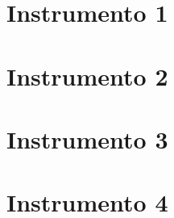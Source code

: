 \begin{apendicesenv}
\section{Instrumento 1}
    \begin{figure}
        \centering
         
    \end{figure}
\newpage
\section{Instrumento 2}
    \begin{figure}
        \centering
         
    \end{figure}
\newpage
\section{Instrumento 3}
    \begin{figure}
        \centering
         
    \end{figure}
\newpage
\section{Instrumento 4}
    \begin{figure}
        \centering
         
    \end{figure}
\newpage







\end{apendicesenv}

